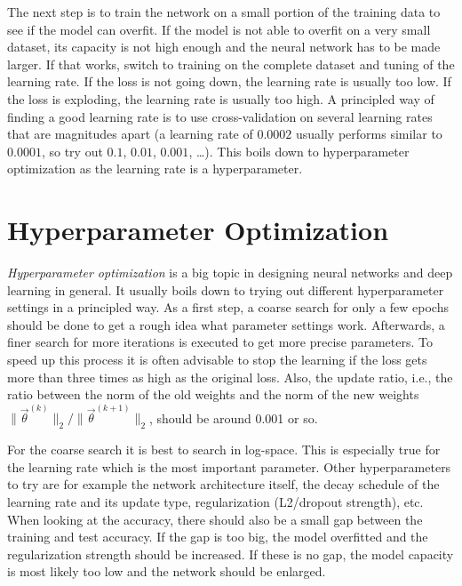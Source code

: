 		The next step is to train the network on a small portion of the training data to see if the model can overfit. If the model is not able to overfit on a very small dataset, its capacity is not high enough and the neural network has to be made larger. If that works, switch to training on the complete dataset and tuning of the learning rate. If the loss is not going down, the learning rate is usually too low. If the loss is exploding, the learning rate is usually too high. A principled way of finding a good learning rate is to use cross-validation on several learning rates that are magnitudes apart (a learning rate of \(0.0002\) usually performs similar to \(0.0001\), so try out \(0.1\), \(0.01\), \(0.001\), \dots). This boils down to hyperparameter optimization as the learning rate is a hyperparameter.

		\section{Hyperparameter Optimization}
			\label{subsec:hyperparameterOpt}

			\emph{Hyperparameter optimization} is a big topic in designing neural networks and deep learning in general. It usually boils down to trying out different hyperparameter settings in a principled way. As a first step, a coarse search for only a few epochs should be done to get a rough idea what parameter settings work. Afterwards, a finer search for more iterations is executed to get more precise parameters. To speed up this process it is often advisable to stop the learning if the loss gets more than three times as high as the original loss. Also, the update ratio, i.e., the ratio between the norm of the old weights and the norm of the new weights \( \lVert \vec{\theta}^{(k)} \rVert_2 / \lVert \vec{\theta}^{(k + 1)} \rVert_2 \), should be around \num{0.001} or so.

			For the coarse search it is best to search in log-space. This is especially true for the learning rate which is the most important parameter. Other hyperparameters to try are for example the network architecture itself, the decay schedule of the learning rate and its update type, regularization (L2/dropout strength), etc. When looking at the accuracy, there should also be a small gap between the training and test accuracy. If the gap is too big, the model overfitted and the regularization strength should be increased. If these is no gap, the model capacity is most likely too low and the network should be enlarged.

